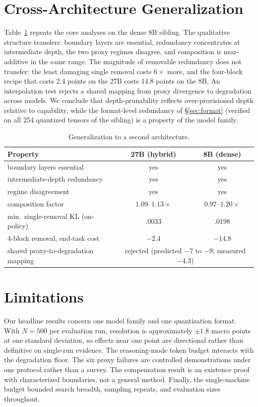 \documentclass[10pt]{article}
\begin{document}
\section{Cross-Architecture Generalization}
\label{sec:gen}
Table~\ref{tab:gen} repeats the core analyses on the dense 8B sibling. The qualitative structure transfers: boundary layers are essential, redundancy concentrates at intermediate depth, the two proxy regimes disagree, and composition is near-additive in the same range. The magnitude of removable redundancy does not transfer: the least damaging single removal costs $6\times$ more, and the four-block recipe that costs 2.4 points on the 27B costs 14.8 points on the 8B. An interpolation test rejects a shared mapping from proxy divergence to degradation across models. We conclude that depth-prunability reflects over-provisioned depth relative to capability, while the format-level redundancy of \S\ref{sec:format} (verified on all 254 quantized tensors of the sibling) is a property of the model family.

\begin{table}[h]
\centering\small
\begin{tabular}{p{}cc}
\toprule
Property & 27B (hybrid) & 8B (dense) \\
\midrule
boundary layers essential & yes & yes \\
intermediate-depth redundancy & yes & yes \\
regime disagreement & yes & yes \\
composition factor & $1.09$--$1.13\times$ & $0.97$--$1.20\times$ \\
min.\ single-removal KL (on-policy) & .0033 & .0198 \\
4-block removal, end-task cost & $-2.4$ & $-14.8$ \\
shared proxy-to-degradation mapping & \multicolumn{2}{c}{rejected (predicted $-7$ to $-9$; measured $-4.3$)} \\
\bottomrule
\end{tabular}
\caption{Generalization to a second architecture.}
\label{tab:gen}
\end{table}

\section{Limitations}
Our headline results concern one model family and one quantization format. With $N{=}500$ per evaluation run, resolution is approximately $\pm1.8$ macro points at one standard deviation, so effects near one point are directional rather than definitive on single-run evidence. The reasoning-mode token budget interacts with the degradation floor. The six proxy failures are controlled demonstrations under one protocol rather than a survey. The compensation result is an existence proof with characterized boundaries, not a general method. Finally, the single-machine budget bounded search breadth, sampling repeats, and evaluation sizes throughout.
\end{document}
